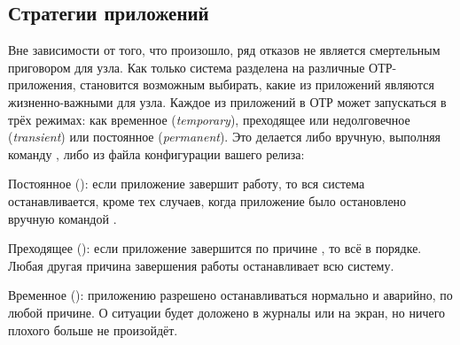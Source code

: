 \documentclass[11pt, oneside]{book}   	%
\begin{document}
\subsection{Стратегии приложений}
\label{subsec:start-link-application-strategies}

\sloppy{}
Вне зависимости от того, что произошло, ряд отказов не является смертельным приговором для узла. Как только система разделена на различные ОТР-приложения, становится возможным выбирать, какие из приложений являются жизненно-важными для узла. Каждое из приложений в ОТР может запускаться в трёх режимах: как временное (\emph{temporary}), преходящее или недолговечное (\emph{transient}) или постоянное (\emph{permanent}). Это делается либо вручную, выполняя команду , либо из файла конфигурации вашего релиза:

\begin{itemize*}
	\item Постоянное (): если приложение завершит работу, то вся система останавливается, кроме тех случаев, когда приложение было остановлено вручную командой .
	\item Преходящее (): если приложение завершится по причине , то всё в порядке. Любая другая причина завершения работы останавливает всю систему.
	\item Временное (): приложению разрешено останавливаться нормально и аварийно, по любой причине. О ситуации будет доложено в журналы или на экран, но ничего плохого больше не произойдёт.
\end{itemize*}
\end{document}
